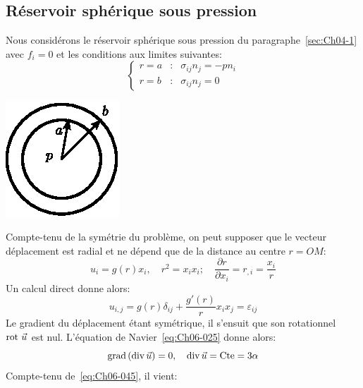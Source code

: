 \subsection{Réservoir sphérique sous pression} \label{ssec:Ch06-2.2}
\begin{multicols}{2}
    Nous considérons le réservoir sphérique sous pression du paragraphe~\ref{sec:Ch04-1} avec $f_i = 0$ et les conditions aux limites suivantes:
    \begin{equation}
        \left\{
        \begin{aligned}
            r=a &:& \sigma_{ij} n_j = -p n_i \\
            r=b &:& \sigma_{ij} n_j = 0
        \end{aligned}
        \right.
        \label{eq:Ch06-042}
    \end{equation}
    \columnbreak
    \begin{center}
        \includegraphics{../images/T1_Ch06-03}
    \end{center}
\end{multicols}
Compte-tenu de la symétrie du problème, on peut supposer que le vecteur déplacement est radial et ne dépend que de la distance au centre $r=OM$:
\begin{equation}
    u_i = g(r) x_i,\quad
    r^2 = x_i x_i;\quad \frac{\partial r}{\partial x_i} = r_{,i} = \frac{x_i}{r}
    \label{eq:Ch04-044}
\end{equation}
Un calcul direct donne alors:
\begin{equation}
    u_{i,j} = g(r) \delta_{ij} + \frac{g'(r)}{r} x_i x_j = \varepsilon_{ij}
    \label{eq:Ch06-045}
\end{equation}
Le gradient du déplacement étant symétrique, il s'ensuit que son rotationnel $\operatorname*{\mathrm{rot}\,} \vec{u}$ est nul.
L'équation de Navier~\eqref{eq:Ch06-025} donne alors:
\begin{equation}
    \operatorname*{\mathrm{grad}} \left( \operatorname*{\mathrm{div}} \vec{u} \right) = 0 ,\quad \operatorname*{\mathrm{div}} \vec{u} = \text{Cte} = 3 \alpha
    \label{eq:Ch06-046}
\end{equation}
Compte-tenu de~\eqref{eq:Ch06-045}, il vient:
